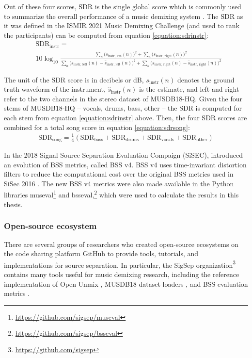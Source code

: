 \documentclass[report.tex]{subfiles}
\begin{document}
Out of these four scores, SDR is the single global score which is commonly used to summarize the overall performance of a music demixing system \parencite{sdruseful}. The SDR as it was defined in the ISMIR 2021 Music Demixing Challenge (and used to rank the participants) can be computed from equation \eqref{equation:sdrinstr}:
\begin{align}
	\nonumber & \text{SDR}_{\text{instr}} = \\
	&10 \log_{10}\frac{\sum_{n}\big(s_{\text{instr, left}}(n)\big)^{2} + \sum_{n}\big(s_{\text{instr, right}}(n)\big)^{2}}{\sum_{n}\big(s_{\text{instr, left}}(n) - \hat{s}_{\text{instr, left}}(n)\big)^{2} + \sum_{n}\big(s_{\text{instr, right}}(n) - \hat{s}_{\text{instr, right}}(n)\big)^{2}} \tag{22}\label{equation:sdrinstr}
\end{align}

The unit of the SDR score is in decibels or dB, $s_{\text{instr}}(n)$ denotes the ground truth waveform of the instrument, $\hat{s}_{\text{instr}}(n)$ is the estimate, and left and right refer to the two channels in the stereo dataset of MUSDB18-HQ. Given the four stems of MUSDB18-HQ -- vocals, drums, bass, other -- the SDR is computed for each stem from equation \eqref{equation:sdrinstr} above. Then, the four SDR scores are combined for a total song score in equation \eqref{equation:sdrsong}:
\begin{align}
	\text{SDR}_{\text{song}} = \frac{1}{4}(\text{SDR}_{\text{bass}} + \text{SDR}_{\text{drums}} + \text{SDR}_{\text{vocals}} + \text{SDR}_{\text{other}}) \tag{23}\label{equation:sdrsong}
\end{align}

In the 2018 Signal Source Separation Evaluation Compaign (SiSEC), \textcite{sisec2018} introduced an evolution of BSS metrics, called BSS v4. BSS v4 uses time-invariant distortion filters to reduce the computational cost over the original BSS metrics used in SiSec 2016 \parencite{sisec2016}. The new BSS v4 metrics were also made available in the Python libraries museval\footnote{\url{https://github.com/sigsep/museval}} and bsseval,\footnote{\url{https://github.com/sigsep/bsseval}} which were used to calculate the results in this thesis.

\subsubsection{Open-source ecosystem}

There are several groups of researchers who created open-source ecosystems on the code sharing platform GitHub to provide tools, tutorials, and implementations for source separation. In particular, the SigSep organization\footnote{\url{https://github.com/sigsep}} contains many tools useful for music demixing research, including the reference implementation of Open-Unmix \parencite{umx}, MUSDB18 dataset loaders \parencite{musdb18, musdb18hq}, and BSS evaluation metrics \parencite{bss, sisec2018}.
\end{document}

